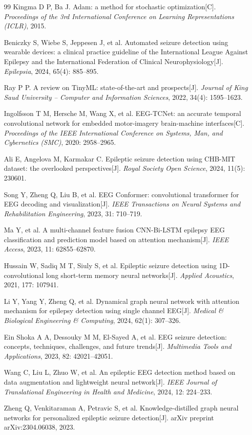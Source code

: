 \documentclass[12pt, a4paper]{article}
\begin{document}
\begin{thebibliography}{99}
Kingma D P, Ba J. Adam: a method for stochastic optimization[C]. \emph{Proceedings of the 3rd International Conference on Learning Representations (ICLR)}, 2015.

Beniczky S, Wiebe S, Jeppesen J, et al. Automated seizure detection using wearable devices: a clinical practice guideline of the International League Against Epilepsy and the International Federation of Clinical Neurophysiology[J]. \emph{Epilepsia}, 2024, 65(4): 885--895.

Ray P P. A review on TinyML: state-of-the-art and prospects[J]. \emph{Journal of King Saud University -- Computer and Information Sciences}, 2022, 34(4): 1595--1623.

Ingolfsson T M, Hersche M, Wang X, et al. EEG-TCNet: an accurate temporal convolutional network for embedded motor-imagery brain-machine interfaces[C]. \emph{Proceedings of the IEEE International Conference on Systems, Man, and Cybernetics (SMC)}, 2020: 2958--2965.

Ali E, Angelova M, Karmakar C. Epileptic seizure detection using CHB-MIT dataset: the overlooked perspectives[J]. \emph{Royal Society Open Science}, 2024, 11(5): 230601.

Song Y, Zheng Q, Liu B, et al. EEG Conformer: convolutional transformer for EEG decoding and visualization[J]. \emph{IEEE Transactions on Neural Systems and Rehabilitation Engineering}, 2023, 31: 710--719.

Ma Y, et al. A multi-channel feature fusion CNN-Bi-LSTM epilepsy EEG classification and prediction model based on attention mechanism[J]. \emph{IEEE Access}, 2023, 11: 62855--62870.

Hussain W, Sadiq M T, Siuly S, et al. Epileptic seizure detection using 1D-convolutional long short-term memory neural networks[J]. \emph{Applied Acoustics}, 2021, 177: 107941.

Li Y, Yang Y, Zheng Q, et al. Dynamical graph neural network with attention mechanism for epilepsy detection using single channel EEG[J]. \emph{Medical \& Biological Engineering \& Computing}, 2024, 62(1): 307--326.

Ein Shoka A A, Dessouky M M, El-Sayed A, et al. EEG seizure detection: concepts, techniques, challenges, and future trends[J]. \emph{Multimedia Tools and Applications}, 2023, 82: 42021--42051.

Wang C, Liu L, Zhuo W, et al. An epileptic EEG detection method based on data augmentation and lightweight neural network[J]. \emph{IEEE Journal of Translational Engineering in Health and Medicine}, 2024, 12: 224--233.

Zheng Q, Venkitaraman A, Petravic S, et al. Knowledge-distilled graph neural networks for personalized epileptic seizure detection[J]. arXiv preprint arXiv:2304.06038, 2023.

\end{thebibliography}
\end{document}
